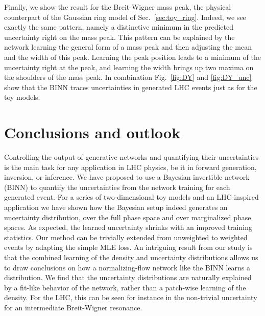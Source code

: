Finally, we show the result for the Breit-Wigner mass peak, the
physical counterpart of the Gaussian ring model of
Sec.~\ref{sec:toy_ring}. Indeed, we see exactly the same pattern,
namely a distinctive minimum in the predicted uncertainty right on
the mass peak.  This pattern can be explained by the network learning
the general form of a mass peak and then adjusting the mean and the
width of this peak. Learning the peak position leads to a minimum of
the uncertainty right at the peak, and learning the width brings up
two maxima on the shoulders of the mass peak.  In combination
Fig.~\ref{fig:DY} and \ref{fig:DY_unc} show that the BINN
traces uncertainties in generated LHC events just as for the toy
models.

\section{Conclusions and outlook}

Controlling the output of generative networks and quantifying their
uncertainties is the main task for any application in LHC physics, be
it in forward generation, inversion, or inference.  We have proposed
to use a Bayesian invertible network (BINN) to quantify the
uncertainties from the network training for each generated event. For
a series of two-dimensional toy models and an LHC-inspired
application we have shown how the Bayesian setup indeed generates an
uncertainty distribution, over the full phase space and over marginalized phase
spaces. As expected, the learned uncertainty shrinks with an improved training
statistics. Our method can be trivially extended
from unweighted to weighted events by adapting the simple MLE loss.
An intriguing result from our study is that the combined learning of
the density and uncertainty distributions allows us to draw conclusions on
how a normalizing-flow network like the BINN learns a distribution. 
We find that the uncertainty distributions are naturally explained by a
fit-like behavior of the network, rather than a patch-wise learning of
the density. For the LHC, this can be seen for instance in the
non-trivial uncertainty for an intermediate Breit-Wigner
resonance. 

%
